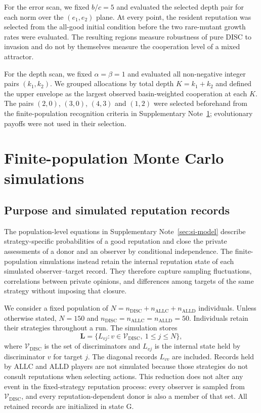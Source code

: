 \documentclass[fleqn,10pt]{wlscirep}
\begin{document}
For the error scan, we fixed $b/c=5$ and evaluated the selected depth pair for each norm over the $(e_1,e_2)$ plane. At every point, the resident reputation was selected from the all-good initial condition before the two rare-mutant growth rates were evaluated. The resulting regions measure robustness of pure $\mathrm{DISC}$ to invasion and do not by themselves measure the cooperation level of a mixed attractor.

For the depth scan, we fixed $\alpha=\beta=1$ and evaluated all non-negative integer pairs $(k_1,k_2)$. We grouped allocations by total depth $K=k_1+k_2$ and defined the upper envelope as the largest observed basin-weighted cooperation at each $K$. The pairs $(2,0)$, $(3,0)$, $(4,3)$ and $(1,2)$ were selected beforehand from the finite-population recognition criteria in Supplementary Note~\ref{sec:si-finite-monte-carlo}; evolutionary payoffs were not used in their selection.



\section{Finite-population Monte Carlo simulations}
\label{sec:si-finite-monte-carlo}

\subsection{Purpose and simulated reputation records}

The population-level equations in Supplementary Note~\ref{sec:si-model} describe strategy-specific probabilities of a good reputation and close the private assessments of a donor and an observer by conditional independence. The finite-population simulations instead retain the internal reputation state of each simulated observer--target record. They therefore capture sampling fluctuations, correlations between private opinions, and differences among targets of the same strategy without imposing that closure.

We consider a fixed population of $N=n_{\mathrm{DISC}}+n_{\mathrm{ALLC}}+n_{\mathrm{ALLD}}$ individuals. Unless otherwise stated, $N=150$ and $n_{\mathrm{DISC}}=n_{\mathrm{ALLC}}=n_{\mathrm{ALLD}}=50$. Individuals retain their strategies throughout a run. The simulation stores
\[
\mathbf L=\{L_{vj}:v\in\mathcal V_{\mathrm{DISC}},\ 1\leq j\leq N\},
\]
where $\mathcal V_{\mathrm{DISC}}$ is the set of discriminators and $L_{vj}$ is the internal state held by discriminator $v$ for target $j$. The diagonal records $L_{vv}$ are included. Records held by $\mathrm{ALLC}$ and $\mathrm{ALLD}$ players are not simulated because those strategies do not consult reputations when selecting actions. This reduction does not alter any event in the fixed-strategy reputation process: every observer is sampled from $\mathcal V_{\mathrm{DISC}}$, and every reputation-dependent donor is also a member of that set. All retained records are initialized in state $\mathrm G$.
\end{document}
